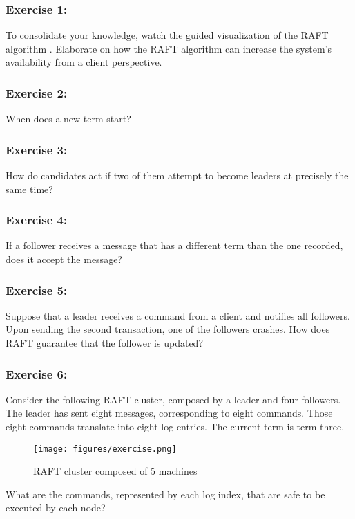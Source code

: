 \documentclass[12pt,a4paper]{article}
\begin{document}
\subsubsection*{Exercise 1:} To consolidate your knowledge, watch the guided visualization of the RAFT algorithm \cite{raft_viz}.
Elaborate on how the RAFT algorithm can increase the system's availability from a client perspective.

\subsubsection*{Exercise 2:} When does a new term start?



\subsubsection*{Exercise 3:} How do candidates act if two of them attempt to become leaders at precisely the same time?


\subsubsection*{Exercise 4:} If a follower receives a message that has a different term than the one recorded, does it accept the message?

\subsubsection*{Exercise 5:} Suppose that a leader receives a command from a client and notifies all followers. Upon sending the second transaction, one of the followers crashes. How does RAFT guarantee that the follower is updated?



\subsubsection*{Exercise 6:} Consider the following RAFT cluster, composed by a leader and four followers. The leader has sent eight messages, corresponding to eight commands. Those eight commands translate into eight log entries. The current term is term three.
\begin{figure}[H]
\centering
\texttt{[image: figures/exercise.png]}
\caption{RAFT cluster composed of 5 machines}
\label{fig:RAFT_cluster}
\end{figure}

What are the commands, represented by each log index, that are safe to be executed by each node?
\end{document}

